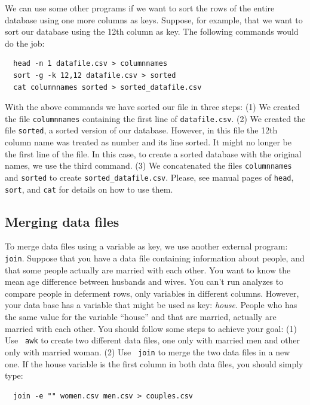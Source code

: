 \documentclass[12pt,english]{article}
\begin{document}
We can use some other programs if we want to sort the rows
of the entire database using one more columns as keys.
Suppose, for example, that we want to sort our database
using the 12th column as key.  The following commands would
do the job:

\begin{verbatim}  
  head -n 1 datafile.csv > columnnames
  sort -g -k 12,12 datafile.csv > sorted
  cat columnnames sorted > sorted_datafile.csv
\end{verbatim}

With the above commands we have sorted our file in three
steps: (1) We created the file {\tt columnnames} containing
the first line of {\tt datafile.csv}. (2) We created the file
{\tt sorted}, a sorted version of our database. However, in
this file the 12th column name was treated as number and its
line sorted. It might no longer be the first line of the
file.  In this case, to create a sorted database with the
original names, we use the third command. (3) We
concatenated the files {\tt columnnames} and {\tt sorted} to
create {\tt sorted\_datafile.csv}. Please, see manual pages of
{\tt head}, {\tt sort}, and {\tt cat} for details on how to
use them.

\subsection{Merging data files}

To merge data files using a variable as key, we use another
external program: {\tt join}. Suppose that you have a data
file containing information about people, and that some
people actually are married with each other. You want to
know the mean age difference between husbands and wives. You
can't run analyzes to compare people in deferment rows, only
variables in different columns. However, your data base has
a variable that might be used as key: {\em house}. People
who has the same value for the variable ``house'' and that
are married, actually are married with each other. You
should follow some steps to achieve your goal: (1) Use {\tt
awk} to create two different data files, one only with
married men and other only with married woman. (2) Use {\tt
join} to merge the two data files in a new one. If the house
variable is the first column in both data files, you should
simply type:

\begin{verbatim}
  join -e "" women.csv men.csv > couples.csv
\end{verbatim}
\end{document}
